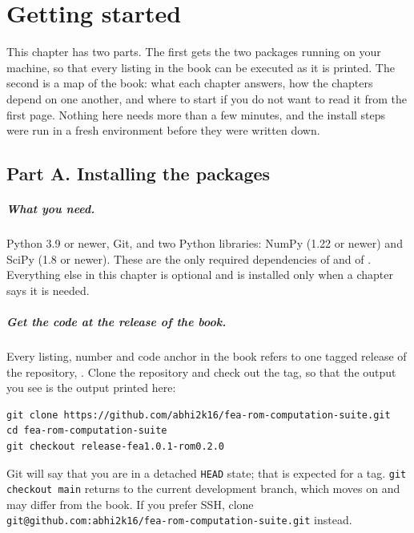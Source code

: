 \chapter*{Getting started}

This chapter has two parts. The first gets the two packages running on your machine, so that every listing in the book can be executed as it is printed. The second is a map of the book: what each chapter answers, how the chapters depend on one another, and where to start if you do not want to read it from the first page. Nothing here needs more than a few minutes, and the install steps were run in a fresh environment before they were written down.

\section*{Part A. Installing the packages}

\paragraph{What you need.} Python 3.9 or newer, Git, and two Python libraries: NumPy (1.22 or newer) and SciPy (1.8 or newer). These are the only required dependencies of \fea{} and of \rom{}. Everything else in this chapter is optional and is installed only when a chapter says it is needed.

\paragraph{Get the code at the release of the book.} Every listing, number and code anchor in the book refers to one tagged release of the repository, \booktag{}. Clone the repository and check out the tag, so that the output you see is the output printed here:
\begin{lstlisting}[language={},numbers=none,keywordstyle={},commentstyle={},frame=single]
git clone https://github.com/abhi2k16/fea-rom-computation-suite.git
cd fea-rom-computation-suite
git checkout release-fea1.0.1-rom0.2.0
\end{lstlisting}
Git will say that you are in a detached \texttt{HEAD} state; that is expected for a tag. \texttt{git checkout main} returns to the current development branch, which moves on and may differ from the book. If you prefer SSH, clone \texttt{git@github.com:abhi2k16/fea-rom-computation-suite.git} instead.

